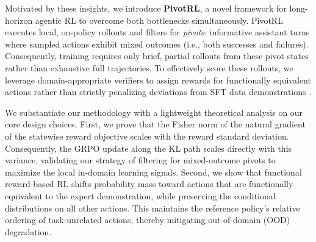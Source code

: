 Motivated by these insights, we introduce \textbf{PivotRL}, a novel framework for long-horizon agentic RL to overcome both bottlenecks simultaneously. PivotRL executes local, on-policy rollouts and filters for \emph{pivots}: informative assistant turns where sampled actions exhibit mixed outcomes (i.e., both successes and failures). Consequently, training requires only brief, partial rollouts from these pivot states rather than exhaustive full trajectories. To effectively score these rollouts, we leverage domain-appropriate verifiers to assign rewards for functionally equivalent actions rather than strictly penalizing deviations from SFT data demonstrations \citep{shao2024deepseekmath, rohatgi2025tamingprocessverifiers}.

We substantiate our methodology with a lightweight theoretical analysis on our core design choices. 
{First, we prove that the Fisher norm of the natural gradient of the statewise reward objective scales with the reward standard deviation. Consequently, the GRPO update along the KL path scales directly with this variance, validating our strategy of filtering for mixed-outcome pivots to maximize the local in-domain learning signals.}
{Second, we show that functional reward-based RL shifts probability mass toward actions that are functionally equivalent to the expert demonstration, while preserving the conditional distributions on all other actions. This maintains the reference policy's relative ordering of task-unrelated actions, thereby mitigating out-of-domain (OOD) degradation.} 

